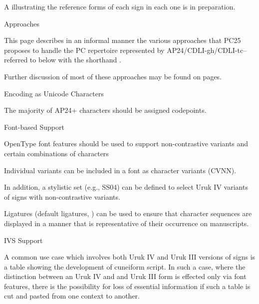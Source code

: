 \par A  illustrating the reference forms
      of each sign in each one is in preparation.

\Hh{}Approaches


\par This page describes in an informal manner the various
      approaches that PC25 proposes to handle the PC repertoire
      represented by AP24/CDLI-gh/CDLI-tc--referred to below with the
      shorthand .


\par Further discussion of most of these approaches may be found
      on  pages.

\Hhhh{}Encoding as Unicode Characters


\par The majority of AP24+ characters should be assigned codepoints.

\Hhhh{}Font-based Support


\par OpenType font features should be used to support
      non-contrastive variants and certain combinations of characters


\par Individual variants can be included in a font as character
      variants (CVNN).


\par In addition, a stylistic set (e.g., SS04) can
      be defined to select Uruk IV variants of signs with
      non-contrastive variants.


\par Ligatures (default ligatures, ) can be used
      to ensure that character sequences are displayed in a manner
      that is representative of their occurrence on manuscripts.

\Hhhh{}IVS Support


\par A common use case which involves both Uruk IV and Uruk III
      versions of signs is a table showing the development of
      cuneiform script.  In such a case, where the distinction between
      an Uruk IV and and Uruk III form is effected only via font
      features, there is the possibility for loss of essential
      information if such a table is cut and pasted from one context
      to another.


